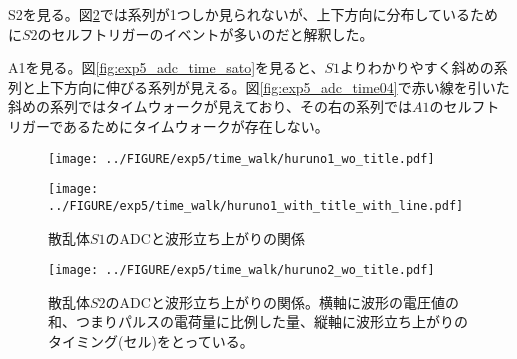 \documentclass[../../main.tex]{subfiles}
\numberwithin{equation}{section}
\numberwithin{table}{section}
\numberwithin{figure}{section}
\begin{document}
    S2を見る。図\ref{fig:exp5_adc_time_huruno2}では系列が1つしか見られないが、上下方向に分布しているために$S2$のセルフトリガーのイベントが多いのだと解釈した。

    A1を見る。図\ref{fig:exp5_adc_time_sato}を見ると、$S1$よりわかりやすく斜めの系列と上下方向に伸びる系列が見える。図\ref{fig:exp5_adc_time04}で赤い線を引いた斜めの系列ではタイムウォークが見えており、その右の系列では$A1$のセルフトリガーであるためにタイムウォークが存在しない。

    \begin{figure}[tbp]
      \begin{minipage}[b]{0.48\columnwidth}
        \centering
        \texttt{[image: ../FIGURE/exp5/time\_walk/huruno1\_wo\_title.pdf]}
        \label{fig:exp5_adc_time01}
      \end{minipage}
      \hspace{0.04\columnwidth} %
      \begin{minipage}[b]{0.48\columnwidth}
        \centering
        \texttt{[image: ../FIGURE/exp5/time\_walk/huruno1\_with\_title\_with\_line.pdf]}
        \label{fig:exp5_adc_time02}
      \end{minipage}
      \caption{散乱体$S1$のADCと波形立ち上がりの関係}\label{fig:exp5_adc_time_huruno1}
    \end{figure}

    \begin{figure}[tbp]
      \centering
      \texttt{[image: ../FIGURE/exp5/time\_walk/huruno2\_wo\_title.pdf]}

      \caption{散乱体$S2$のADCと波形立ち上がりの関係。横軸に波形の電圧値の和、つまりパルスの電荷量に比例した量、縦軸に波形立ち上がりのタイミング(セル)をとっている。}\label{fig:exp5_adc_time_huruno2}
    \end{figure}
\end{document}

